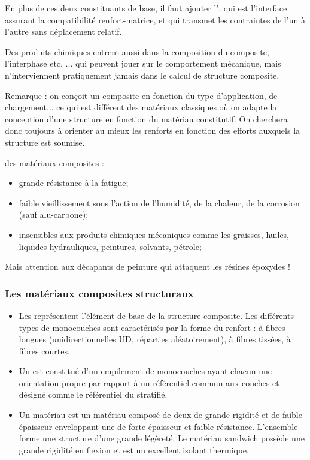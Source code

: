 \medskip
En plus de ces deux constituants de base, il faut ajouter l', qui est l'interface 
assurant la compatibilité renfort-matrice, et qui transmet les contraintes de l'un à l'autre sans
 déplacement relatif.

\medskip
Des produits chimiques entrent aussi dans la composition du composite, l'interphase etc. ... 
qui peuvent jouer sur le comportement mécanique, mais n'interviennent pratiquement
jamais dans le calcul de structure composite.

\medskip
{} Remarque : on conçoit un composite en fonction du type d'application, de chargement... ce qui est différent
des matériaux classiques où on adapte la conception d'une structure en fonction du matériau constitutif.
On cherchera donc toujours à orienter au mieux les renforts en fonction des efforts auxquels la structure 
est soumise.

\medskip
{} des matériaux composites :
\begin{itemize}
	\item  grande résistance à la fatigue;
	\item  faible vieillissement sous l'action de l'humidité, de la chaleur, de la corrosion (sauf alu-carbone);
	\item  insensibles aux produits chimiques \og mécaniques\fg{} comme les graisses, huiles, liquides hydrauliques,
		 peintures, solvants, pétrole;
\end{itemize}
Mais attention aux décapants de peinture qui attaquent les résines époxydes !


\medskip
\subsubsection{Les matériaux composites structuraux}

\begin{itemize}
	\item  Les  représentent l'élément de base de la structure composite.
		 Les différents types de monocouches sont caractérisés par la forme du renfort :
		 à fibres longues (unidirectionnelles UD, réparties aléatoirement), à fibres tissées,
		 à fibres courtes.
	\item  Un  est constitué d'un empilement de monocouches ayant chacun une orientation
		 propre par rapport à un référentiel commun aux couches et désigné comme le
		 référentiel du stratifié.
	\item Un matériau  est un matériau composé de deux 
		 de grande rigidité et de faible épaisseur enveloppant une  
		de forte épaisseur et faible résistance. 
		L'ensemble forme une structure d'une grande légèreté. 
		Le matériau sandwich possède une grande rigidité en flexion et est un excellent isolant
		 thermique.
\end{itemize}

